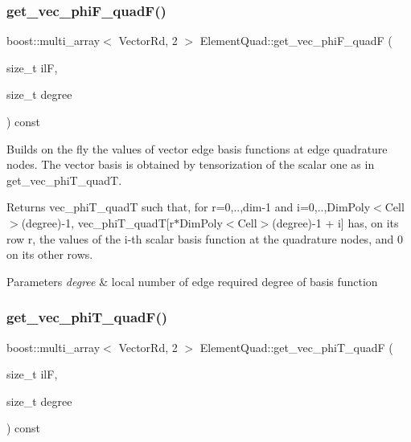 \subsubsection{\texorpdfstring{get\+\_\+vec\+\_\+phi\+F\+\_\+quad\+F()}{get\_vec\_phiF\_quadF()}}
{\footnotesize\ttfamily boost\+::multi\+\_\+array$<$ Vector\+Rd, 2 $>$ Element\+Quad\+::get\+\_\+vec\+\_\+phi\+F\+\_\+quadF (\begin{DoxyParamCaption}\item[{size\+\_\+t}]{ilF,  }\item[{size\+\_\+t}]{degree }\end{DoxyParamCaption}) const}



Builds on the fly the values of vector edge basis functions at edge quadrature nodes. The vector basis is obtained by tensorization of the scalar one as in get\+\_\+vec\+\_\+phi\+T\+\_\+quadT. 

\begin{DoxyReturn}{Returns}
vec\+\_\+phi\+T\+\_\+quadT such that, for r=0,..,dim-\/1 and i=0,..,Dim\+Poly$<$\+Cell$>$(degree)-\/1, vec\+\_\+phi\+T\+\_\+quadT\mbox{[}r$\ast$\+Dim\+Poly$<$\+Cell$>$(degree)-\/1 + i\mbox{]} has, on its row r, the values of the i-\/th scalar basis function at the quadrature nodes, and 0 on its other rows. 
\end{DoxyReturn}

\begin{DoxyParams}{Parameters}
{\em degree} & local number of edge required degree of basis function \\
\hline
\end{DoxyParams}
\mbox{\label{classHArDCore2D_1_1ElementQuad_ad470965a0f66f62c1ffed045e2dd49fc}} 
\subsubsection{\texorpdfstring{get\+\_\+vec\+\_\+phi\+T\+\_\+quad\+F()}{get\_vec\_phiT\_quadF()}}
{\footnotesize\ttfamily boost\+::multi\+\_\+array$<$ Vector\+Rd, 2 $>$ Element\+Quad\+::get\+\_\+vec\+\_\+phi\+T\+\_\+quadF (\begin{DoxyParamCaption}\item[{size\+\_\+t}]{ilF,  }\item[{size\+\_\+t}]{degree }\end{DoxyParamCaption}) const}



